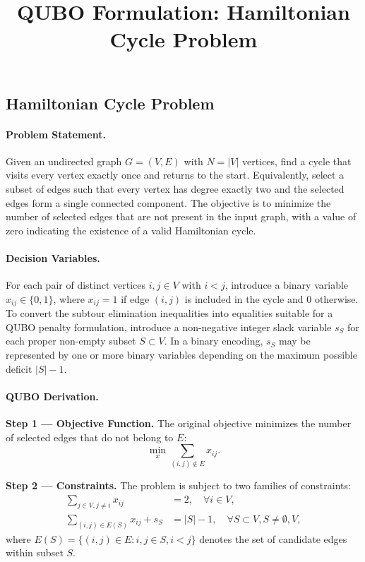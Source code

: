 \documentclass[12pt]{article}
\title{QUBO Formulation: Hamiltonian Cycle Problem}
\date{}
\begin{document}
\maketitle

\subsection*{Hamiltonian Cycle Problem}

\paragraph{Problem Statement.}
Given an undirected graph $G=(V,E)$ with $N=|V|$ vertices, find a cycle that visits every vertex exactly once and returns to the start. Equivalently, select a subset of edges such that every vertex has degree exactly two and the selected edges form a single connected component. The objective is to minimize the number of selected edges that are not present in the input graph, with a value of zero indicating the existence of a valid Hamiltonian cycle.

\paragraph{Decision Variables.}
For each pair of distinct vertices $i,j \in V$ with $i<j$, introduce a binary variable $x_{ij} \in \{0,1\}$, where $x_{ij}=1$ if edge $(i,j)$ is included in the cycle and $0$ otherwise. To convert the subtour elimination inequalities into equalities suitable for a QUBO penalty formulation, introduce a non-negative integer slack variable $s_S$ for each proper non-empty subset $S \subset V$. In a binary encoding, $s_S$ may be represented by one or more binary variables depending on the maximum possible deficit $|S|-1$.

\paragraph{QUBO Derivation.}
\textbf{Step 1 --- Objective Function.}
The original objective minimizes the number of selected edges that do not belong to $E$:
\begin{equation}
\min_{x} \sum_{(i,j) \notin E} x_{ij}.
\end{equation}

\textbf{Step 2 --- Constraints.}
The problem is subject to two families of constraints:
\begin{align}
\sum_{j \in V, j \neq i} x_{ij} &= 2, \quad \forall i \in V, \label{eq:degree} \\
\sum_{(i,j) \in E(S)} x_{ij} + s_S &= |S| - 1, \quad \forall S \subset V, S \neq \emptyset, V, \label{eq:subtour}
\end{align}
where $E(S) = \{(i,j) \in E : i,j \in S, i<j\}$ denotes the set of candidate edges within subset $S$.
\end{document}
